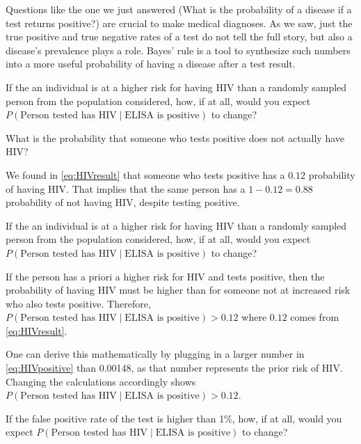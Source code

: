 \documentclass[]{book}
\theoremstyle{definition}
\theoremstyle{definition}
\theoremstyle{definition}
\theoremstyle{remark}
\let\BeginKnitrBlock\begin \let\EndKnitrBlock\end
\begin{document}
Questions like the one we just answered (What is the probability of a
disease if a test returns positive?) are crucial to make medical
diagnoses. As we saw, just the true positive and true negative rates of
a test do not tell the full story, but also a disease's prevalence plays
a role. Bayes' rule is a tool to synthesize such numbers into a more
useful probability of having a disease after a test result.

If the an individual is at a higher risk for having HIV than a randomly
sampled person from the population considered, how, if at all, would you
expect \(P(\text{Person tested has HIV} \mid \text{ELISA is positive})\)
to change?

\BeginKnitrBlock{example}
\protect\hypertarget{exm:unnamed-chunk-3}{}{\label{exm:unnamed-chunk-3}
}What is the probability that someone who tests positive does not
actually have HIV?
\EndKnitrBlock{example}

We found in \eqref{eq:HIVresult} that someone who tests positive has a
\(0.12\) probability of having HIV. That implies that the same person
has a \(1-0.12=0.88\) probability of not having HIV, despite testing
positive.

\BeginKnitrBlock{example}
\protect\hypertarget{exm:unnamed-chunk-4}{}{\label{exm:unnamed-chunk-4} }If
the an individual is at a higher risk for having HIV than a randomly
sampled person from the population considered, how, if at all, would you
expect \(P(\text{Person tested has HIV} \mid \text{ELISA is positive})\)
to change?
\EndKnitrBlock{example}

If the person has a priori a higher risk for HIV and tests positive,
then the probability of having HIV must be higher than for someone not
at increased risk who also tests positive. Therefore,
\(P(\text{Person tested has HIV} \mid \text{ELISA is positive}) > 0.12\)
where \(0.12\) comes from \eqref{eq:HIVresult}.

One can derive this mathematically by plugging in a larger number in
\eqref{eq:HIVpositive} than 0.00148, as that number represents the prior
risk of HIV. Changing the calculations accordingly shows
\(P(\text{Person tested has HIV} \mid \text{ELISA is positive}) > 0.12\).

\BeginKnitrBlock{example}
\protect\hypertarget{exm:unnamed-chunk-5}{}{\label{exm:unnamed-chunk-5} }If
the false positive rate of the test is higher than 1\%, how, if at all,
would you expect
\(P(\text{Person tested has HIV} \mid \text{ELISA is positive})\) to
change?
\EndKnitrBlock{example}
\end{document}
